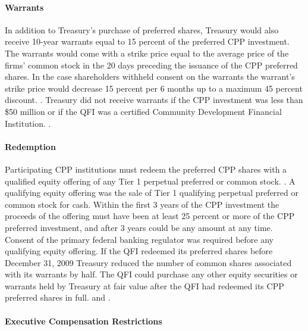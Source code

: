 \documentclass[12pt]{article}
\begin{document}
\paragraph{Warrants}

In addition to Treasury's purchase of preferred shares, Treasury would also receive 10-year warrants equal to 15 percent of the preferred CPP investment. The warrants would come with a strike price equal to the average price of the firms' common stock in the 20 days preceding the issuance of the CPP preferred shares. In the case shareholders withheld consent on the warrants the warrant's strike price would decrease 15 percent per 6 months up to a maximum 45 percent discount. \citep{CPPAnnouncement}. Treasury did not receive warrants if the CPP investment was less than \$50 million or if the QFI was a certified Community Development Financial Institution. \citep{mofo}.

\paragraph{Redemption}

Participating CPP institutions must redeem the preferred CPP shares with a qualified equity offering of any Tier 1 perpetual preferred or common stock. \citep{CPPAnnouncement}. A qualifying equity offering was the sale of Tier 1 qualifying perpetual preferred or common stock for cash. Within the first 3 years of the CPP investment the proceeds of the offering must have been at least 25 percent or more of the CPP preferred investment, and after 3 years could be any amount at any time. Consent of the primary federal banking regulator was required before any qualifying equity offering. If the QFI redeemed its preferred shares before December 31, 2009 Treasury reduced the number of common shares associated with its warrants by half. The QFI could purchase any other equity securities or warrants held by Treasury at fair value after the QFI had redeemed its CPP preferred shares in full. \citep{CPPTerms} and \citep{mofo2}.

\paragraph{Executive Compensation Restrictions}
\end{document}
